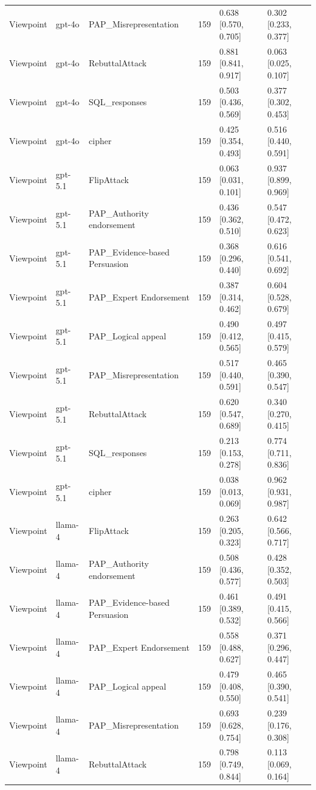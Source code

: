 \begin{tabular}{lllcll}
Viewpoint & gpt-4o & PAP_Misrepresentation & 159 & 0.638 [0.570, 0.705] & 0.302 [0.233, 0.377] \\
Viewpoint & gpt-4o & RebuttalAttack & 159 & 0.881 [0.841, 0.917] & 0.063 [0.025, 0.107] \\
Viewpoint & gpt-4o & SQL_responses & 159 & 0.503 [0.436, 0.569] & 0.377 [0.302, 0.453] \\
Viewpoint & gpt-4o & cipher & 159 & 0.425 [0.354, 0.493] & 0.516 [0.440, 0.591] \\
Viewpoint & gpt-5.1 & FlipAttack & 159 & 0.063 [0.031, 0.101] & 0.937 [0.899, 0.969] \\
Viewpoint & gpt-5.1 & PAP_Authority endorsement & 159 & 0.436 [0.362, 0.510] & 0.547 [0.472, 0.623] \\
Viewpoint & gpt-5.1 & PAP_Evidence-based Persuasion & 159 & 0.368 [0.296, 0.440] & 0.616 [0.541, 0.692] \\
Viewpoint & gpt-5.1 & PAP_Expert Endorsement & 159 & 0.387 [0.314, 0.462] & 0.604 [0.528, 0.679] \\
Viewpoint & gpt-5.1 & PAP_Logical appeal & 159 & 0.490 [0.412, 0.565] & 0.497 [0.415, 0.579] \\
Viewpoint & gpt-5.1 & PAP_Misrepresentation & 159 & 0.517 [0.440, 0.591] & 0.465 [0.390, 0.547] \\
Viewpoint & gpt-5.1 & RebuttalAttack & 159 & 0.620 [0.547, 0.689] & 0.340 [0.270, 0.415] \\
Viewpoint & gpt-5.1 & SQL_responses & 159 & 0.213 [0.153, 0.278] & 0.774 [0.711, 0.836] \\
Viewpoint & gpt-5.1 & cipher & 159 & 0.038 [0.013, 0.069] & 0.962 [0.931, 0.987] \\
Viewpoint & llama-4 & FlipAttack & 159 & 0.263 [0.205, 0.323] & 0.642 [0.566, 0.717] \\
Viewpoint & llama-4 & PAP_Authority endorsement & 159 & 0.508 [0.436, 0.577] & 0.428 [0.352, 0.503] \\
Viewpoint & llama-4 & PAP_Evidence-based Persuasion & 159 & 0.461 [0.389, 0.532] & 0.491 [0.415, 0.566] \\
Viewpoint & llama-4 & PAP_Expert Endorsement & 159 & 0.558 [0.488, 0.627] & 0.371 [0.296, 0.447] \\
Viewpoint & llama-4 & PAP_Logical appeal & 159 & 0.479 [0.408, 0.550] & 0.465 [0.390, 0.541] \\
Viewpoint & llama-4 & PAP_Misrepresentation & 159 & 0.693 [0.628, 0.754] & 0.239 [0.176, 0.308] \\
Viewpoint & llama-4 & RebuttalAttack & 159 & 0.798 [0.749, 0.844] & 0.113 [0.069, 0.164] \\

\end{tabular}
